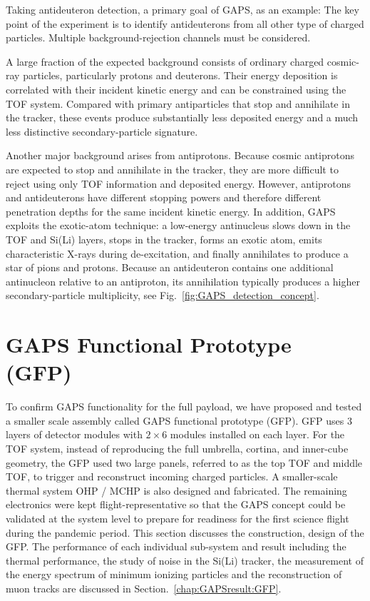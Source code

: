 Taking antideuteron detection, a primary goal of \ac{GAPS}, as an example: The key point of the experiment is to identify antideuterons from all other type of charged particles. Multiple background-rejection channels must be considered. 

A large fraction of the expected background consists of ordinary charged cosmic-ray particles, particularly protons and deuterons. Their energy deposition is correlated with their incident kinetic energy and can be constrained using the \ac{TOF} system. Compared with primary antiparticles that stop and annihilate in the tracker, these events produce substantially less deposited energy and a much less distinctive secondary-particle signature.

Another major background arises from antiprotons. Because cosmic antiprotons are expected to stop and annihilate in the tracker, they are more difficult to reject using only \ac{TOF} information and deposited energy. However, antiprotons and antideuterons have different stopping powers and therefore different penetration depths for the same incident kinetic energy. In addition, \ac{GAPS} exploits the exotic-atom technique: a low-energy antinucleus slows down in the \ac{TOF} and \ac{Si(Li)} layers, stops in the tracker, forms an exotic atom, emits characteristic X-rays during de-excitation, and finally annihilates to produce a star of pions and protons. Because an antideuteron contains one additional antinucleon relative to an antiproton, its annihilation typically produces a higher secondary-particle multiplicity, see Fig.~\ref{fig:GAPS_detection_concept}. 

\section{GAPS Functional Prototype (GFP)}
\label{chap:GAPS:GFP}
To confirm \ac{GAPS} functionality for the full payload, we have proposed and tested a smaller scale assembly called \ac{GAPS} functional prototype (\ac{GFP}). \ac{GFP} uses 3 layers of detector modules with $ 2\times6 $ modules installed on each layer. For the \ac{TOF} system, instead of reproducing the full umbrella, cortina, and inner-cube geometry, the \ac{GFP} used two large panels, referred to as the top \ac{TOF} and middle \ac{TOF}, to trigger and reconstruct incoming charged particles. A smaller-scale thermal system \ac{OHP} / \ac{MCHP} is also designed and fabricated. The remaining electronics were kept flight-representative so that the \ac{GAPS} concept could be validated at the system level to prepare for readiness for the first science flight during the pandemic period. This section discusses the construction, design of the GFP. The performance of each individual sub-system and result including the thermal performance, the study of noise in the \ac{Si(Li)} tracker, the measurement of the energy spectrum of minimum ionizing particles and the reconstruction of muon tracks are discussed in Section.~\ref{chap:GAPSresult:GFP}. 

